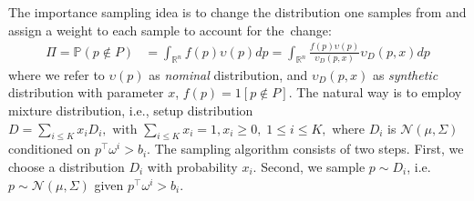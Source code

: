 The importance sampling idea is to change the distribution one samples from and assign a weight to each sample to account for the~change: 
\begin{align*}
    \Pi  = \mathbb{P}(p\not\in P) & = \int_{\mathbb{R}^n} f(p) \upsilon(p) dp = \!\int_{\mathbb{R}^n}\!\! \frac{f(p)\upsilon(p)}{\upsilon_D(p,x)}\upsilon_D(p,x) dp%
\end{align*}
where we refer to $\upsilon(p)$ as \emph{nominal} distribution, and $\upsilon_D(p,x)$ as \emph{synthetic} distribution with parameter $x$,  $f(p) = 1[p\not\in P]$. The natural way is to employ mixture distribution, i.e., setup distribution $D = \sum_{i \le K} x_i D_i, \text{ with } \sum_{i\le K} x_i = 1, x_i \ge 0, \; 1\le i \le K,$ where $D_i$ is $\mathcal{N}(\mu,\Sigma)$ conditioned on $p^\top\omega^i > \!b_i$. The sampling algorithm consists of two steps. First, we choose a distribution $D_i$ with probability $x_i$. Second, we sample $p \sim D_i$, i.e. $p\sim \mathcal{N}(\mu,\Sigma)$ given $p^\top\omega^i>b_i$. 



